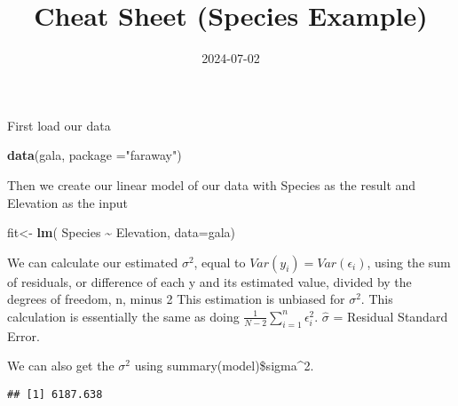 \documentclass[
]{article}
\title{Cheat Sheet (Species Example)}
\author{}
\date{\vspace{-2.5em}2024-07-02}
\newenvironment{Shaded}{\begin{snugshade}}{\end{snugshade}}
\newcommand{\AttributeTok}[1]{\textcolor[rgb]{0.13,0.29,0.53}{#1}}
\newcommand{\DecValTok}[1]{\textcolor[rgb]{0.00,0.00,0.81}{#1}}
\newcommand{\FunctionTok}[1]{\textcolor[rgb]{0.13,0.29,0.53}{\textbf{#1}}}
\newcommand{\NormalTok}[1]{#1}
\newcommand{\OtherTok}[1]{\textcolor[rgb]{0.56,0.35,0.01}{#1}}
\newcommand{\SpecialCharTok}[1]{\textcolor[rgb]{0.81,0.36,0.00}{\textbf{#1}}}
\newcommand{\StringTok}[1]{\textcolor[rgb]{0.31,0.60,0.02}{#1}}
\begin{document}
\maketitle

First load our data

\begin{Shaded}
\begin{Highlighting}[]
\FunctionTok{data}\NormalTok{(gala, }\AttributeTok{package =}\StringTok{"faraway"}\NormalTok{)}
\end{Highlighting}
\end{Shaded}

Then we create our linear model of our data with Species as the result
and Elevation as the input

\begin{Shaded}
\begin{Highlighting}[]
\NormalTok{fit}\OtherTok{\textless{}{-}} \FunctionTok{lm}\NormalTok{( Species }\SpecialCharTok{\textasciitilde{}}\NormalTok{ Elevation, }\AttributeTok{data=}\NormalTok{gala)}
\end{Highlighting}
\end{Shaded}

We can calculate our estimated \(\sigma^2\), equal to
\(Var(y_i)=Var(\epsilon_i)\), using the sum of residuals, or difference
of each y and its estimated value, divided by the degrees of freedom, n,
minus 2 This estimation is unbiased for \(\sigma^2\). This calculation
is essentially the same as doing
\(\frac{1}{N-2}\sum_{i=1}^n\epsilon_i^2\). \(\hat{\sigma}\) = Residual
Standard Error.

We can also get the \(\sigma^2\) using summary(model)\$sigma\^{}2.

\begin{Shaded}
\end{Shaded}

\begin{verbatim}
## [1] 6187.638
\end{verbatim}

\begin{Shaded}
\end{Shaded}
\end{document}
